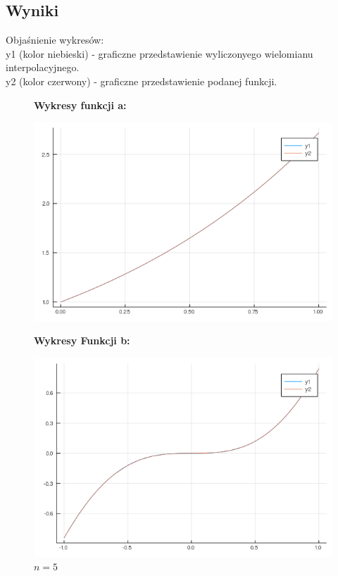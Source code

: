\documentclass[11pt, a4paper]{article}
\begin{document}
    \subsection{Wyniki}
    Objaśnienie wykresów:\\
    y1 (kolor niebieski) - graficzne przedstawienie wyliczonyego wielomianu interpolacyjnego.\\
    y2 (kolor czerwony) - graficzne przedstawienie podanej funkcji.
    \begin{figure}[H]
        \captionsetup{labelformat = empty}
        \begin{minipage}{0.5\textwidth}
            \centerline{\textbf{Wykresy funkcji a:}}
            \caption{$n=5$}
            \centering
            \includegraphics[width=\linewidth]{plot-5_a_n5}
        \end{minipage}
        \begin{minipage}{0.5\textwidth}
            \centerline{\textbf{Wykresy Funkcji b:}}
            \caption{$n=5$}
            \centering
            \includegraphics[width=\linewidth]{plot-5_b_n5}
        \end{minipage}


\end{figure}
\end{document}
